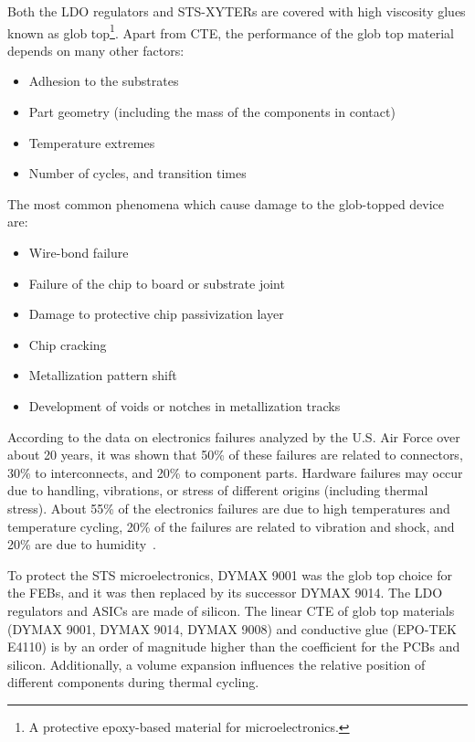 Both the \gls{LDO} regulators and STS-XYTERs are covered with high viscosity glues known as glob top\footnote{A protective epoxy-based material for microelectronics.}. Apart from \gls{CTE}, the performance of the glob top material depends on many other factors:
\begin{itemize}
    \item Adhesion to the substrates
    \item Part geometry (including the mass of the components in contact)
    \item Temperature extremes
    \item Number of cycles, and transition times
\end{itemize}


The most common phenomena which cause damage to the glob-topped device are:
\begin{itemize}
    \item Wire-bond failure
    \item Failure of the chip to board or substrate joint
    \item Damage to protective chip passivization layer
    \item Chip cracking
    \item Metallization pattern shift
    \item Development of voids or notches in metallization tracks
\end{itemize}


According to the data on electronics failures analyzed by the U.S. Air Force over about 20 years, it was shown that 50\% of these failures are related to connectors, 30\% to interconnects, and 20\% to component
parts. Hardware failures may occur due to handling, vibrations, or stress of different origins (including thermal stress). About 55\% of the electronics failures are due to high temperatures and temperature cycling, 20\% of the failures are related to vibration and shock, and 20\% are due to humidity~\cite{thermal_electronics}. 

To protect the STS microelectronics, DYMAX 9001 was the glob top choice for the \glspl{FEB}, and it was then replaced by its successor DYMAX 9014. The \gls{LDO} regulators and \glspl{ASIC} are made of silicon. The linear CTE of glob top materials (DYMAX 9001, DYMAX 9014, DYMAX 9008) and conductive glue (EPO-TEK E4110) is by an order of magnitude higher than the coefficient for the \glspl{PCB} and silicon. Additionally, a volume expansion influences the relative position of different components during thermal cycling.

